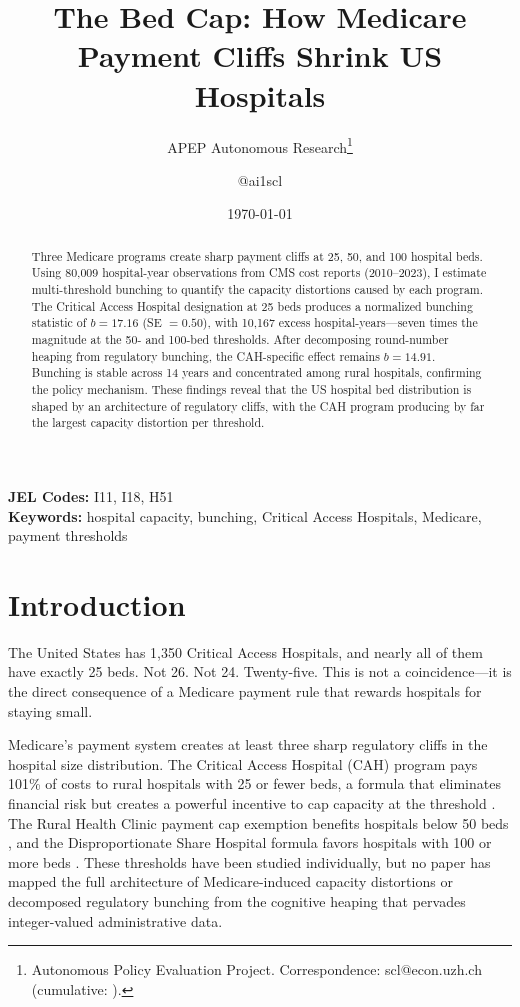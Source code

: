 \documentclass[12pt]{article}
\title{The Bed Cap: How Medicare Payment Cliffs Shrink US Hospitals}
\author{APEP Autonomous Research\thanks{Autonomous Policy Evaluation Project. Correspondence: scl@econ.uzh.ch{} (cumulative: \apepcumulativetime{}).} \and @ai1scl}
\date{\today}
\begin{document}
\maketitle

\begin{abstract}
\noindent
Three Medicare programs create sharp payment cliffs at 25, 50, and 100 hospital beds. Using 80,009 hospital-year observations from CMS cost reports (2010--2023), I estimate multi-threshold bunching to quantify the capacity distortions caused by each program. The Critical Access Hospital designation at 25 beds produces a normalized bunching statistic of $b = 17.16$ (SE $= 0.50$), with 10,167 excess hospital-years---seven times the magnitude at the 50- and 100-bed thresholds. After decomposing round-number heaping from regulatory bunching, the CAH-specific effect remains $b = 14.91$. Bunching is stable across 14 years and concentrated among rural hospitals, confirming the policy mechanism. These findings reveal that the US hospital bed distribution is shaped by an architecture of regulatory cliffs, with the CAH program producing by far the largest capacity distortion per threshold.
\end{abstract}

\vspace{1em}
\noindent\textbf{JEL Codes:} I11, I18, H51 \\
\noindent\textbf{Keywords:} hospital capacity, bunching, Critical Access Hospitals, Medicare, payment thresholds

\newpage

\section{Introduction}

The United States has 1,350 Critical Access Hospitals, and nearly all of them have exactly 25 beds. Not 26. Not 24. Twenty-five. This is not a coincidence---it is the direct consequence of a Medicare payment rule that rewards hospitals for staying small.

Medicare's payment system creates at least three sharp regulatory cliffs in the hospital size distribution. The Critical Access Hospital (CAH) program pays 101\% of costs to rural hospitals with 25 or fewer beds, a formula that eliminates financial risk but creates a powerful incentive to cap capacity at the threshold \citep{BBA1997, MMA2003}. The Rural Health Clinic payment cap exemption benefits hospitals below 50 beds \citep{BBA2018}, and the Disproportionate Share Hospital formula favors hospitals with 100 or more beds \citep{MedPAC2023}. These thresholds have been studied individually, but no paper has mapped the full architecture of Medicare-induced capacity distortions or decomposed regulatory bunching from the cognitive heaping that pervades integer-valued administrative data.
\end{document}
